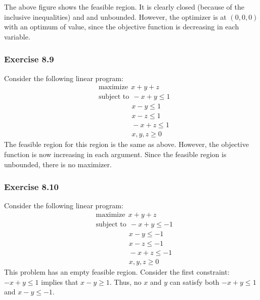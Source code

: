 \documentclass[letterpaper,12pt]{article}
\theoremstyle{definition}
\begin{document}
The above figure shows the feasible region. It is clearly closed (because of the inclusive inequalities) and and unbounded. However, the optimizer is at $(0,0,0)$ with an optimum of value, since the objective function is decreasing in each variable.

\subsubsection*{Exercise 8.9}
Consider the following linear program:
\begin{align*}
&\text{maximize} \ \ x + y + z \\
  &\text{subject to} \ \ -x + y \leq 1 \\
  &\qquad \qquad \ \ \ x - y \leq 1 \\
  &\qquad \qquad \ \ \ x - z \leq 1 \\
  &\qquad \qquad \ \ \ -x + z \leq 1 \\
  &\qquad \qquad \ \ \ x, y ,z \geq 0
\end{align*}
The feasible region for this region is the same as above. However, the objective function is now increasing in each argument. Since the feasible region is unbounded, there is no maximizer.

\subsubsection*{Exercise 8.10}
Consider the following linear program:
\begin{align*}
&\text{maximize} \ \ x + y + z \\
  &\text{subject to} \ \ -x + y \leq -1 \\
  &\qquad \qquad \ \ \ x - y \leq -1 \\
  &\qquad \qquad \ \ \ x - z \leq -1 \\
  &\qquad \qquad \ \ \ -x + z \leq -1 \\
  &\qquad \qquad \ \ \ x, y ,z \geq 0
\end{align*}
This problem has an empty feasible region. Consider the first constraint: $-x + y \leq 1$ implies that $x - y \geq 1$. Thus, no $x$ and $y$ can satisfy both $-x + y \leq 1$  and $x - y \leq -1$.
\end{document}
